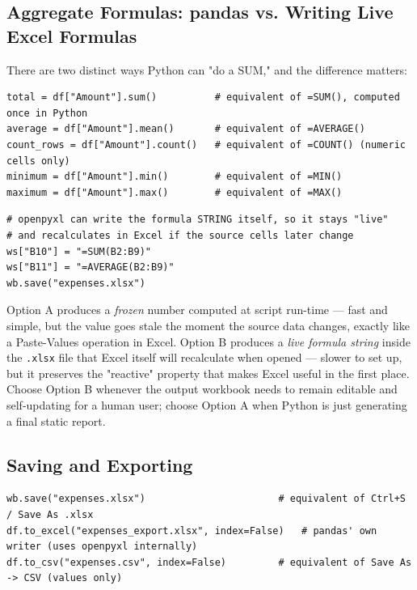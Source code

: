 \documentclass[11pt,a4paper]{article}
\begin{document}
\subsection{Aggregate Formulas: pandas vs. Writing Live Excel Formulas}

There are two distinct ways Python can "do a SUM," and the difference matters:

\begin{lstlisting}[style=pythonstyle, caption={Option A: compute the result in Python (a static number)}]
total = df["Amount"].sum()          # equivalent of =SUM(), computed once in Python
average = df["Amount"].mean()       # equivalent of =AVERAGE()
count_rows = df["Amount"].count()   # equivalent of =COUNT() (numeric cells only)
minimum = df["Amount"].min()        # equivalent of =MIN()
maximum = df["Amount"].max()        # equivalent of =MAX()
\end{lstlisting}

\begin{lstlisting}[style=pythonstyle, caption={Option B: write an actual live Excel formula into the .xlsx file}]
# openpyxl can write the formula STRING itself, so it stays "live"
# and recalculates in Excel if the source cells later change
ws["B10"] = "=SUM(B2:B9)"
ws["B11"] = "=AVERAGE(B2:B9)"
wb.save("expenses.xlsx")
\end{lstlisting}

\begin{keyconcept}
Option A produces a \emph{frozen} number computed at script run-time --- fast and simple, but the value goes stale the moment the source data changes, exactly like a Paste-Values operation in Excel. Option B produces a \emph{live formula string} inside the \texttt{.xlsx} file that Excel itself will recalculate when opened --- slower to set up, but it preserves the "reactive" property that makes Excel useful in the first place. Choose Option B whenever the output workbook needs to remain editable and self-updating for a human user; choose Option A when Python is just generating a final static report.
\end{keyconcept}

\subsection{Saving and Exporting}

\begin{lstlisting}[style=pythonstyle, caption={Common export paths, mirroring Excel's Save/Save As/Export}]
wb.save("expenses.xlsx")                       # equivalent of Ctrl+S / Save As .xlsx
df.to_excel("expenses_export.xlsx", index=False)   # pandas' own writer (uses openpyxl internally)
df.to_csv("expenses.csv", index=False)         # equivalent of Save As -> CSV (values only)
\end{lstlisting}
\end{document}
